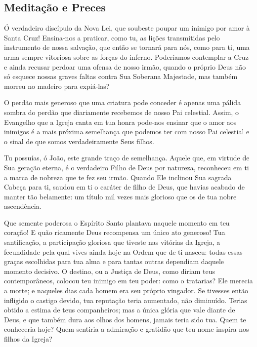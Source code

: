 \documentclass[18pt]{letter}
\begin{document}
\begin{justify}
\begin{center}
  \section{Meditação e Preces}
\end{center}

Ó verdadeiro discípulo da Nova Lei, que soubeste poupar um inimigo por amor à Santa Cruz! Ensina-nos a praticar, como tu, as lições transmitidas pelo instrumento de nossa salvação, que então se tornará para nós, como para ti, uma arma sempre vitoriosa sobre as forças do inferno. Poderíamos contemplar a Cruz e ainda recusar perdoar uma ofensa de nosso irmão, quando o próprio Deus não só esquece nossas graves faltas contra Sua Soberana Majestade, mas também morreu no madeiro para expiá-las?

O perdão mais generoso que uma criatura pode conceder é apenas uma pálida sombra do perdão que diariamente recebemos de nosso Pai celestial. Assim, o Evangelho que a Igreja canta em tua honra pode-nos ensinar que o amor aos inimigos é a mais próxima semelhança que podemos ter com nosso Pai celestial e o sinal de que somos verdadeiramente Seus filhos.

Tu possuías, ó João, este grande traço de semelhança. Aquele que, em virtude de Sua geração eterna, é o verdadeiro Filho de Deus por natureza, reconheceu em ti a marca de nobreza que te fez seu irmão. Quando Ele inclinou Sua sagrada Cabeça para ti, saudou em ti o caráter de filho de Deus, que havias acabado de manter tão belamente: um título mil vezes mais glorioso que os de tua nobre ascendência.

Que semente poderosa o Espírito Santo plantava naquele momento em teu coração! E quão ricamente Deus recompensa um único ato generoso! Tua santificação, a participação gloriosa que tiveste nas vitórias da Igreja, a fecundidade pela qual vives ainda hoje na Ordem que de ti nasceu: todas essas graças escolhidas para tua alma e para tantas outras dependiam daquele momento decisivo. O destino, ou a Justiça de Deus, como diriam teus contemporâneos, colocou teu inimigo em teu poder: como o tratarias? Ele merecia a morte; e naqueles dias cada homem era seu próprio vingador. Se tivesses então infligido o castigo devido, tua reputação teria aumentado, não diminuído. Terias obtido a estima de teus companheiros; mas a única glória que vale diante de Deus, e que também dura aos olhos dos homens, jamais teria sido tua. Quem te conheceria hoje? Quem sentiria a admiração e gratidão que teu nome inspira nos filhos da Igreja?


\end{justify}
\end{document}
